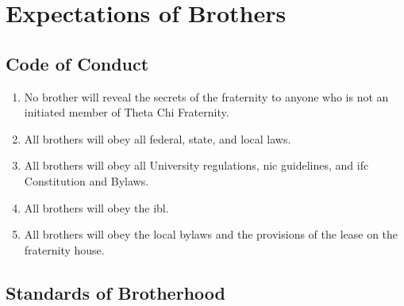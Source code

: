 \chapter{Expectations of Brothers}
\label{expectations-bhood}

\section{Code of Conduct}
	\begin{enumerate}
		\item No brother will reveal the secrets of the fraternity to anyone who is not an initiated member of Theta Chi Fraternity.
		\item All brothers will obey all federal, state, and local laws.
		\item All brothers will obey all University regulations, \gls{nic} guidelines, and \gls{ifc} Constitution and Bylaws.
		\item All brothers will obey the \gls{ibl}.
		\item All brothers will obey the local bylaws and the provisions of the lease on the fraternity house.

	\end{enumerate}

\section{Standards of Brotherhood}

